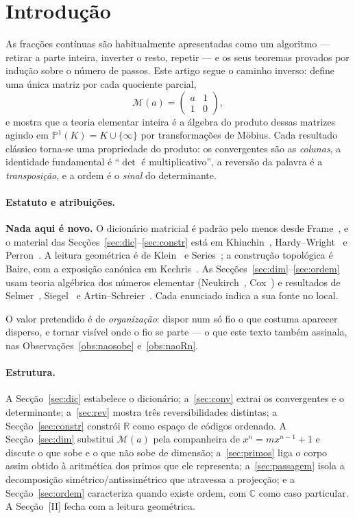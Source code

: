 \documentclass[11pt,a4paper]{article}
\theoremstyle{plain}
\theoremstyle{definition}
\theoremstyle{remark}
\newcommand{\R}{\mathbb{R}}
\newcommand{\C}{\mathbb{C}}
\newcommand{\Pj}{\mathbb{P}^1}
\newcommand{\Mat}[1]{\mathcal{M}(#1)}
\begin{document}
\section{Introdução}\label{sec:intro}

As fracções contínuas são habitualmente apresentadas como um algoritmo --- retirar a parte inteira,
inverter o resto, repetir --- e os seus teoremas provados por indução sobre o número de passos. Este
artigo segue o caminho inverso: define uma única matriz por cada quociente parcial,
\[
  \Mat{a} = \begin{pmatrix} a & 1\\ 1 & 0\end{pmatrix},
\]
e mostra que a teoria elementar inteira é a álgebra do produto dessas matrizes agindo em
$\Pj(K) = K\cup\{\infty\}$ por transformações de Möbius. Cada resultado clássico torna-se uma
propriedade do produto: os convergentes são as \emph{colunas}, a identidade fundamental é
``$\det$ é multiplicativo'', a reversão da palavra é a \emph{transposição}, e a ordem é o
\emph{sinal} do determinante.

\paragraph{Estatuto e atribuições.} \textbf{Nada aqui é novo.} O dicionário matricial é padrão pelo
menos desde Frame~\cite{frame1949}, e o material das Secções~\ref{sec:dic}--\ref{sec:constr} está em
Khinchin~\cite{khinchin}, Hardy--Wright~\cite{hardywright} e Perron~\cite{perron}. A leitura
geométrica é de Klein~\cite{klein1895} e Series~\cite{series1985}; a construção topológica é
Baire, com a exposição canónica em Kechris~\cite{kechris}. As Secções~\ref{sec:dim}--\ref{sec:ordem}
usam teoria algébrica dos números elementar (Neukirch~\cite{neukirch}, Cox~\cite{cox}) e resultados
de Selmer~\cite{selmer1956}, Siegel~\cite{siegel1944} e Artin--Schreier~\cite{lam}. Cada enunciado
indica a sua fonte no local.

O valor pretendido é de \emph{organização}: dispor num só fio o que costuma aparecer disperso, e
tornar visível onde o fio se parte --- o que este texto também assinala, nas
Observações~\ref{obs:naosobe} e~\ref{obs:naoRn}.

\paragraph{Estrutura.} A Secção~\ref{sec:dic} estabelece o dicionário; a~\ref{sec:conv} extrai os
convergentes e o determinante; a~\ref{sec:rev} mostra três reversibilidades distintas; a
Secção~\ref{sec:constr} constrói $\R$ como espaço de códigos ordenado. A Secção~\ref{sec:dim}
substitui $\Mat a$ pela companheira de $x^n = mx^{n-1}+1$ e discute o que sobe e o que não sobe de
dimensão; a~\ref{sec:primos} liga o corpo assim obtido à aritmética dos primos que ele representa;
a~\ref{sec:passagem} isola a decomposição simétrico/antissimétrico que atravessa a projecção; e a
Secção~\ref{sec:ordem} caracteriza quando existe ordem, com $\C$ como caso particular. A
Secção~[II] fecha com a leitura geométrica.
\end{document}
